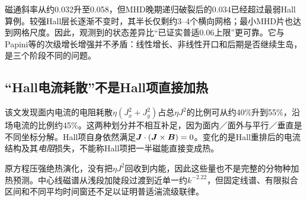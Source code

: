 磁通斜率从约0.032升至0.058，但MHD晚期递归破裂后的0.034已经超过最弱Hall算例。较强Hall层长逐渐不变时，其半长仅剩约3--4个横向网格；最小MHD片也达到网格尺度。因此，观测到的状态差异比“已证实普适0.06上限”更可靠。它与Papini等的次级增长增强并不矛盾：线性增长、非线性开口和后期是否继续生岛，是三个阶段不同的问题。\citep{L262,L263}

\subsection{“Hall电流耗散”不是Hall项直接加热}
该文发现面内电流的电阻耗散$\eta(J_x^2+J_y^2)$占总$\eta J^2$的比例可从约40\%升到55\%，沿场电流的比例约45\%。这两种划分并不相互补足，因为面内／面外与平行／垂直是不同坐标分解。Hall项自身依然满足$\bm{J}\cdot(\bm{J}\times\bm{B})=0$。变化的是Hall重排后的电流结构及其\emph{电阻}损失，不能称Hall项把一半磁能直接变成热。

原方程压强绝热演化，没有把$\eta J^2$回收到内能，因此这些量也不是完整的分物种加热预测。中心线磁谱从浅段加陡段过渡到近单一约$k^{-2.22}$，但固定线谱、有限拟合区间和不同平均时间窗还不足以证明普适湍流级联律。\citep{L263}




